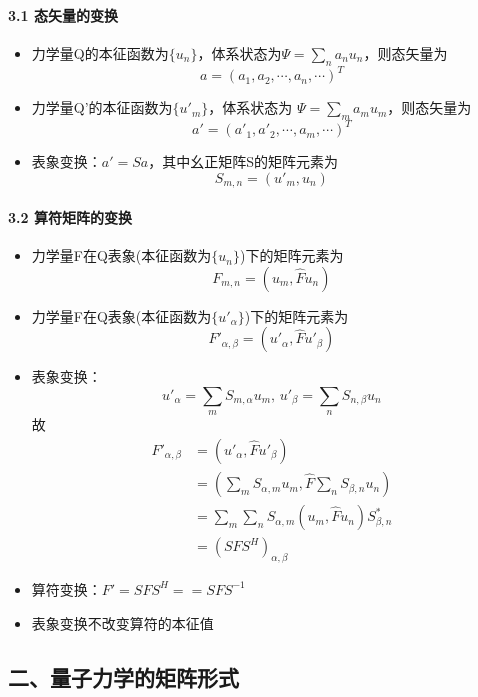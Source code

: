 \documentclass[UTF8,twocolumn]{ctexart}
\providecommand{\tightlist}{%
  \setlength{\itemsep}{0pt}\setlength{\parskip}{0pt}}
\let\oldparagraph\paragraph
\renewcommand{\paragraph}[1]{\oldparagraph{#1}\mbox{}}
\begin{document}
\hypertarget{ux6001ux77e2ux91cfux7684ux53d8ux6362}{%
\paragraph{ 3.1
态矢量的变换}\label{ux6001ux77e2ux91cfux7684ux53d8ux6362}}

\begin{itemize}
\tightlist
\item
  力学量Q的本征函数为\(\{u_n\}\)，体系状态为\(\Psi=\sum_na_nu_n\)，则态矢量为
  \[a=(a_1,a_2,\cdots,a_n,\cdots)^T\]
\item
  力学量Q'的本征函数为\(\{u'_m\}\)，体系状态为 \(\Psi=\sum_ma_mu_m\)，则态矢量为
  \[a'=(a'_1,a'_2,\cdots,a_m,\cdots)^T\]
\item
  表象变换：\(a'=Sa\)，其中幺正矩阵S的矩阵元素为 \[S_{m,n}=(u'_m,u_n)\]
\end{itemize}

\hypertarget{ux7b97ux7b26ux77e9ux9635ux7684ux53d8ux6362}{%
\paragraph{ 3.2
算符矩阵的变换}\label{ux7b97ux7b26ux77e9ux9635ux7684ux53d8ux6362}}

\begin{itemize}
\tightlist
\item
  力学量F在Q表象(本征函数为\(\{u_n\}\))下的矩阵元素为
  \[F_{m,n}=(u_m,\hat{F}u_n)\]
\item
  力学量F在Q表象(本征函数为\(\{u'_{\alpha}\}\))下的矩阵元素为
  \[F'_{\alpha,\beta}=(u'_{\alpha},\hat{F}u'_{\beta})\]
\item
  表象变换：
  \[u'_{\alpha}=\sum_mS_{m,\alpha}u_m,\,u'_{\beta}=\sum_nS_{n,\beta}u_n\]
  故
  \[\begin{aligned}
  F'_{\alpha,\beta}&=(u'_{\alpha},\hat{F}u'_{\beta})\\
  &=(\sum_mS_{\alpha,m}u_m,\hat{F}\sum_nS_{\beta,n}u_n)\\
  &=\sum_m\sum_nS_{\alpha,m}(u_m,\hat{F}u_n)S^*_{\beta,n}\\
  &=(SFS^H)_{\alpha,\beta}
  \end{aligned}\]
\item
  算符变换：\(F'=SFS^H==SFS^{-1}\)
\item
  表象变换不改变算符的本征值
\end{itemize}

\hypertarget{ux4e8cux91cfux5b50ux529bux5b66ux7684ux77e9ux9635ux5f62ux5f0f}{%
\subsection{二、量子力学的矩阵形式}\label{ux4e8cux91cfux5b50ux529bux5b66ux7684ux77e9ux9635ux5f62ux5f0f}}
\end{document}
